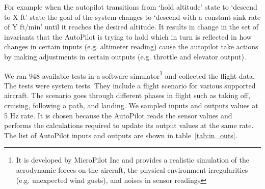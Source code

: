 For example when the autopilot transitions from `hold altitude' state to `descend to X ft' state the goal of the system changes to `descend with a constant sink rate of Y ft/min' until it reaches the desired altitude. It results in change in the set of invariants that the AutoPilot is trying to hold which in turn is reflected in how changes in certain inputs (e.g. altimeter reading) cause the autopilot take actions by making adjustments in certain outputs (e.g. throttle and elevator output). 


We ran 948 available tests in a software simulator\footnote{It is developed by MicroPilot Inc and provides a realistic simulation of the aerodynamic  forces on the aircraft, the physical environment irregularities (e.g. unexpected wind gusts), and noises in sensor readings} and collected the flight data. The tests were system tests. They include a flight scenario for various supported aircraft. The scenario goes through different phases in flight such as taking off, cruising, following a path, and landing.
We sampled inputs and outputs values at 5 Hz rate.
It is chosen because the AutoPilot reads the sensor values and performs the calculations required to update its output values at the same rate.
The list of AutoPilot inputs and outputs are shown in table~\ref{tab:in_outs}.


